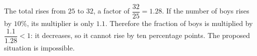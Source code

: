 The total rises from $25$ to $32$, a factor of $\dfrac{32}{25}=1.28$. If the number of boys rises by $10\%$, its multiplier is only $1.1$. Therefore the fraction of boys is multiplied by $\dfrac{1.1}{1.28}<1$: it decreases, so it cannot rise by ten percentage points. The proposed situation is $\boxed{\text{impossible}}$.
